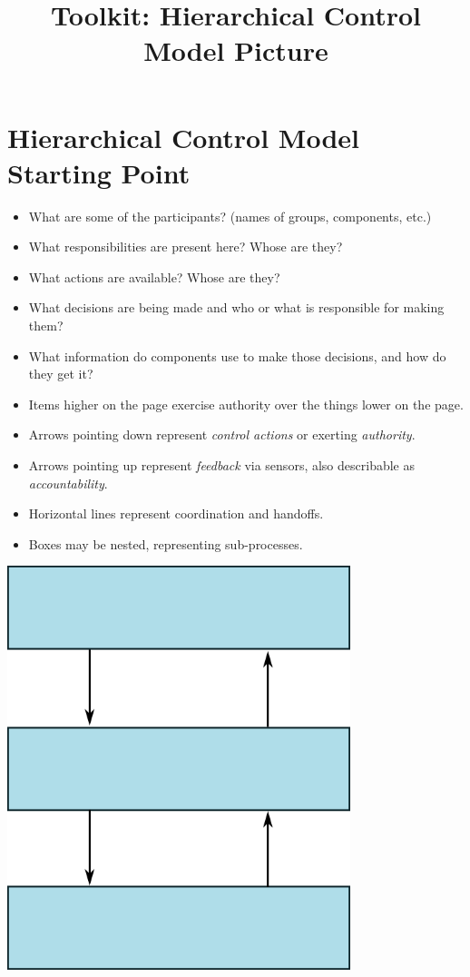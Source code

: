 \documentclass[a4paper]{tufte-book}
\title{Toolkit: Hierarchical Control Model Picture}
\begin{document}
\setlength{\parindent}{0em}
\setlength{\parskip}{.75em}


\section{Hierarchical Control Model Starting Point}

\begin{fullwidth}

\begin{itemize}
\setlength{\itemsep}{0pt}
\setlength{\parskip}{.25em}
\item What are some of the participants? (names of groups, components, etc.)
\item What responsibilities are present here? Whose are they?
\item What actions are available? Whose are they?
\item What decisions are being made and who or what is responsible for making them?
\item What information do components use to make those decisions, and how do they get it?
\end{itemize}


\begin{itemize}
\setlength{\itemsep}{0pt}
\setlength{\parskip}{.25em}
\item Items higher on the page exercise authority over the things lower on the page.
\item Arrows pointing down represent \emph{control actions} or exerting \emph{authority}.
\item Arrows pointing up represent \emph{feedback} via sensors, also describable as \emph{accountability}.
\item Horizontal lines represent coordination and handoffs.
\item Boxes may be nested, representing sub-processes.
\end{itemize}

\begin{center}
\includegraphics[width=10cm]{generic_model.png}
\end{center}

\end{fullwidth}
\end{document}

